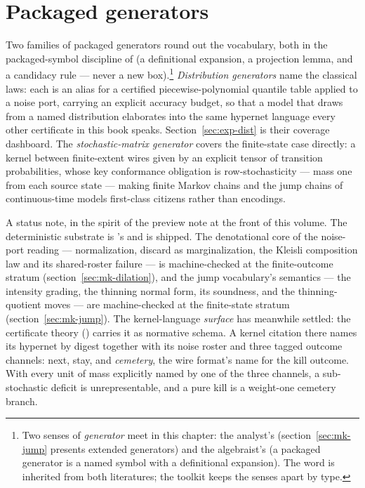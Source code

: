 \section{Packaged generators}
\label{sec:mk-packaged}

Two families of packaged generators round out the vocabulary, both in
the packaged-symbol discipline of
 (a definitional
expansion, a projection lemma, and a candidacy rule --- never a new
box).\footnote{Two senses of \emph{generator} meet in this chapter:
the analyst's (section~\ref{sec:mk-jump} presents extended
generators) and the algebraist's (a packaged generator is a named
symbol with a definitional expansion). The word is inherited from
both literatures; the toolkit keeps the senses apart by type.} \emph{Distribution generators} name the classical laws: each is
an alias for a certified piecewise-polynomial quantile table applied
to a noise port, carrying an explicit accuracy budget, so that a model
that draws from a named distribution elaborates into the same hypernet
language every other certificate in this book speaks.
Section~\ref{sec:exp-dist} is their coverage dashboard. The
\emph{stochastic-matrix generator} covers the finite-state case
directly: a kernel between finite-extent wires given by an explicit
tensor of transition probabilities, whose key conformance obligation
is row-stochasticity --- mass one from each source state --- making
finite Markov chains and the jump chains of continuous-time models
first-class citizens rather than encodings.

A status note, in the spirit of the preview note at the front of this
volume. The deterministic substrate is
's and is shipped.
The denotational core of the noise-port reading ---
normalization, discard as marginalization, the Kleisli composition
law and its shared-roster failure --- is machine-checked at the
finite-outcome stratum (section~\ref{sec:mk-dilation}), and the jump
vocabulary's semantics --- the intensity grading, the thinning
normal form, its soundness, and the thinning-quotient moves --- are
machine-checked at the finite-state stratum
(section~\ref{sec:mk-jump}). The kernel-language \emph{surface} has
meanwhile settled: the certificate theory
() carries it as normative schema. A
kernel citation there names its hypernet by digest together with its
noise roster and three tagged outcome channels: next, stay, and
\emph{cemetery}, the wire format's name for the kill outcome. With
every unit of mass explicitly named by one of the three channels, a
sub-stochastic deficit is unrepresentable, and a pure kill is a
weight-one cemetery branch.

